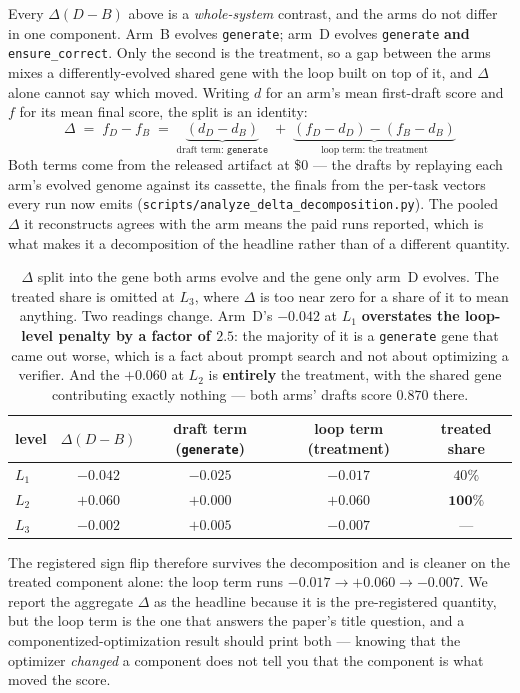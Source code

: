 \documentclass[11pt]{article}
\newcommand{\dd}{\ensuremath{\Delta}}
\begin{document}
Every $\dd(D-B)$ above is a \emph{whole-system} contrast, and the arms do not differ in one
component. Arm~B evolves \texttt{generate}; arm~D evolves \texttt{generate} \textbf{and}
\texttt{ensure\_correct}. Only the second is the treatment, so a gap between the arms mixes a
differently-evolved shared gene with the loop built on top of it, and $\dd$ alone cannot say
which moved. Writing $d$ for an arm's mean first-draft score and $f$ for its mean final score,
the split is an identity:
\[
\dd \;=\; f_D - f_B \;=\; \underbrace{(d_D - d_B)}_{\text{draft term: }\texttt{generate}}
\;+\; \underbrace{(f_D - d_D) - (f_B - d_B)}_{\text{loop term: the treatment}}
\]
Both terms come from the released artifact at \$0 --- the drafts by replaying each arm's evolved
genome against its cassette, the finals from the per-task vectors every run now emits
(\texttt{scripts/analyze\_delta\_decomposition.py}). The pooled $\dd$ it reconstructs agrees
with the arm means the paid runs reported, which is what makes it a decomposition of the
headline rather than of a different quantity.

\begin{table}[h]
\centering
\small
\begin{tabular}{lcccc}
\toprule
level & $\dd(D-B)$ & draft term (\texttt{generate}) & loop term (treatment) & treated share \\
\midrule
$L_1$ & $-0.042$ & $\mathbf{-0.025}$ & $-0.017$ & $40\%$ \\
$L_2$ & $+0.060$ & $\mathbf{+0.000}$ & $\mathbf{+0.060}$ & $\mathbf{100\%}$ \\
$L_3$ & $-0.002$ & $+0.005$ & $-0.007$ & --- \\
\bottomrule
\end{tabular}
\caption{$\dd$ split into the gene both arms evolve and the gene only arm~D evolves. The
treated share is omitted at $L_3$, where $\dd$ is too near zero for a share of it to mean
anything. Two readings change. Arm~D's $-0.042$ at $L_1$ \textbf{overstates the loop-level
penalty by a factor of $2.5$}: the majority of it is a \texttt{generate} gene that came out
worse, which is a fact about prompt search and not about optimizing a verifier. And the
$+0.060$ at $L_2$ is \textbf{entirely} the treatment, with the shared gene contributing
exactly nothing --- both arms' drafts score $0.870$ there.}
\label{tab:decomp}
\end{table}

The registered sign flip therefore survives the decomposition and is cleaner on the treated
component alone: the loop term runs $-0.017 \to +0.060 \to -0.007$. We report the aggregate
$\dd$ as the headline because it is the pre-registered quantity, but the loop term is the one
that answers the paper's title question, and a componentized-optimization result should print
both --- knowing that the optimizer \emph{changed} a component does not tell you that the
component is what moved the score.
\end{document}
